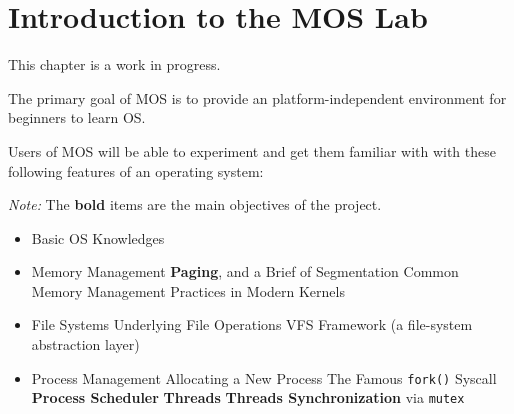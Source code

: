 \chapter*{Introduction to the MOS Lab}

\begin{warning}
    \item This chapter is a work in progress.
\end{warning}

The primary goal of MOS is to provide an platform-independent environment for beginners to learn OS.

Users of MOS will be able to experiment and get them familiar with with these following features
of an operating system:

\textit{Note:} The \textbf{bold} items are the main objectives of the project.

\begin{itemize}
    \item Basic OS Knowledges
    \item Memory Management
          \subitem \textbf{Paging}, and a Brief of Segmentation
          \subitem Common Memory Management Practices in Modern Kernels
    \item File Systems
          \subitem Underlying File Operations
          \subitem VFS Framework (a file-system abstraction layer)
    \item Process Management
          \subitem Allocating a New Process
          \subitem The Famous \texttt{fork()} Syscall
          \subitem \textbf{Process Scheduler}
          \subitem \textbf{Threads}
          \subitem \textbf{Threads Synchronization} via \texttt{mutex}
\end{itemize}
